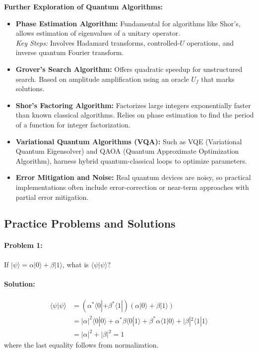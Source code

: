 \documentclass{article}
\begin{document}
\textbf{Further Exploration of Quantum Algorithms:}
\begin{itemize}
    \item \textbf{Phase Estimation Algorithm:} Fundamental for algorithms like Shor's, allows estimation of eigenvalues of a unitary operator. \\
    \emph{Key Steps:} Involves Hadamard transforms, controlled-\(U\) operations, and inverse quantum Fourier transform.
    \item \textbf{Grover's Search Algorithm:} Offers quadratic speedup for unstructured search. Based on amplitude amplification using an oracle \(U_f\) that marks solutions.
    \item \textbf{Shor's Factoring Algorithm:} Factorizes large integers exponentially faster than known classical algorithms. Relies on phase estimation to find the period of a function for integer factorization.
    \item \textbf{Variational Quantum Algorithms (VQA):} Such as VQE (Variational Quantum Eigensolver) and QAOA (Quantum Approximate Optimization Algorithm), harness hybrid quantum-classical loops to optimize parameters.
    \item \textbf{Error Mitigation and Noise:} Real quantum devices are noisy, so practical implementations often include error-correction or near-term approaches with partial error mitigation.
\end{itemize}

\newpage
\subsection{Practice Problems and Solutions}

\paragraph{Problem 1:} If \( |\psi\rangle = \alpha |0\rangle + \beta |1\rangle \), what is \( \langle \psi | \psi \rangle \)?

\paragraph{Solution:}
\begin{align*}
\langle \psi | \psi \rangle &= (\alpha^* \langle 0| + \beta^* \langle 1|)(\alpha |0\rangle + \beta |1\rangle) \\
&= |\alpha|^2 \langle 0|0\rangle + \alpha^*\beta \langle 0|1\rangle + \beta^*\alpha \langle 1|0\rangle + |\beta|^2 \langle 1|1\rangle \\
&= |\alpha|^2 + |\beta|^2 = 1
\end{align*}
where the last equality follows from normalization.
\end{document}
